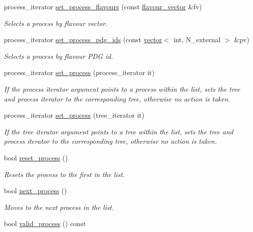 \begin{DoxyCompactItemize}
process\+\_\+iterator \hyperlink{a00065_a566045f554f719276a3e0f1b98f6aae4}{set\+\_\+process\+\_\+flavours} (const \hyperlink{a00579}{flavour\+\_\+vector} \&fv)
\begin{DoxyCompactList}\small\item\em Selects a process by flavour vector. \end{DoxyCompactList}\item 
process\+\_\+iterator \hyperlink{a00065_a1afddfffa00dd964d59e896934874eda}{set\+\_\+process\+\_\+pdg\+\_\+ids} (const \hyperlink{a00579}{vector}$<$ int, N\+\_\+external $>$ \&pv)
\begin{DoxyCompactList}\small\item\em Selects a process by flavour P\+D\+G id. \end{DoxyCompactList}\item 
process\+\_\+iterator \hyperlink{a00065_ace7a8ee9aa706dbba692db474ef08137}{set\+\_\+process} (process\+\_\+iterator it)
\begin{DoxyCompactList}\small\item\em If the process iterator argument points to a process within the list, sets the tree and process iterator to the corresponding tree, otherwise no action is taken. \end{DoxyCompactList}\item 
process\+\_\+iterator \hyperlink{a00065_af627000c0a9297d08d1c619cebed3094}{set\+\_\+process} (tree\+\_\+iterator it)
\begin{DoxyCompactList}\small\item\em If the tree iterator argument points to a tree within the list, sets the tree and process iterator to the corresponding tree, otherwise no action is taken. \end{DoxyCompactList}\item 
\hypertarget{a00065_a58ac0e4e0863aabc955b54a6d07632cd}{}bool \hyperlink{a00065_a58ac0e4e0863aabc955b54a6d07632cd}{reset\+\_\+process} ()\label{a00065_a58ac0e4e0863aabc955b54a6d07632cd}

\begin{DoxyCompactList}\small\item\em Resets the process to the first in the list. \end{DoxyCompactList}\item 
bool \hyperlink{a00065_aa868c04918fdb2f192565892ac10dee5}{next\+\_\+process} ()
\begin{DoxyCompactList}\small\item\em Moves to the next process in the list. \end{DoxyCompactList}\item 
\hypertarget{a00065_a4d7e1455d11c250b296378049592b7d2}{}bool \hyperlink{a00065_a4d7e1455d11c250b296378049592b7d2}{valid\+\_\+process} () const \label{a00065_a4d7e1455d11c250b296378049592b7d2}


\end{DoxyCompactItemize}
